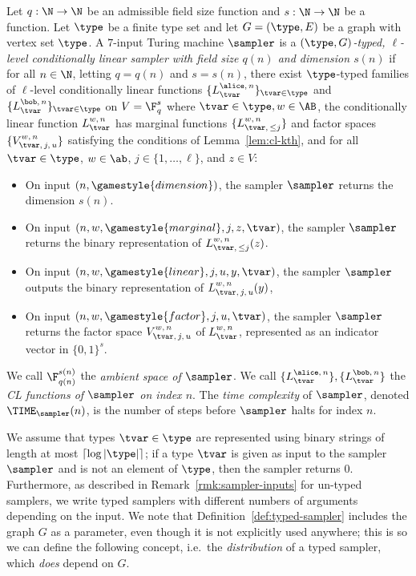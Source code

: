 \begin{definition}
  \label{def:typed-sampler}
	Let $q:\N \to \N$ be an admissible field size function and $s: \N \to \N$ be a
  function.
  Let $\type$ be a finite type set and let $G = (\type, E)$ be a graph with vertex set $\type$.
  A $7$-input Turing machine $\sampler$ is a \emph{$(\type, G)$-typed, $\ell$-level
    conditionally linear sampler with field size $q(n)$ and dimension $s(n)$} if
  for all $n \in \N$, letting $q = q(n)$ and $s = s(n)$, there exist
  $\type$-typed families of $\ell$-level conditionally linear functions
  $\{L^{\alice,\, n}_{\tvar}\}_{\tvar \in \type}$ and $\{L^{\bob,\,
    n}_{\tvar}\}_{\tvar \in \type}$ on $V = \F_q^s$ where $\tvar \in \type, w\in
  \AB$, the conditionally linear function $L^{w,\, n}_{\tvar}$ has marginal
  functions $\{L^{w,\, n}_{\tvar,\, \leq j}\}$ and factor spaces $\{V^{w,\,
    n}_{\tvar,\, j,\, u}\}$ satisfying the conditions of Lemma~\ref{lem:cl-kth},
  and for all $\tvar \in \type$, $w \in \ab$, $j \in \{1, \ldots, \ell\}$, and
  $z \in V$:
  \begin{itemize}
  \item On input $(n, \gamestyle{dimension})$, the sampler $\sampler$ returns
    the dimension $s(n)$.
	
	\item On input $(n, w, \gamestyle{marginal}, j, z, \tvar)$, the sampler
    $\sampler$ returns the binary representation of $L^{w,\, n}_{\tvar,\, \le
      j}(z)$.
			
			\item On input $(n, w, \gamestyle{linear}, j, u, y, \tvar)$, the sampler $\sampler$
    outputs the binary representation of $L^{w,\, n}_{\tvar,\, j,\, u}(y)$,

	\item On input $(n, w, \gamestyle{factor}, j, u, \tvar)$, the sampler
    $\sampler$ returns the factor space $V^{w,\, n}_{\tvar,\, j,\, u}$ of
    $L^{w,\, n}_{\tvar}$, represented as an indicator vector in $\{0,1\}^s$.
  \end{itemize}
  We call $\F_{q(n)}^{s(n)}$ the \emph{ambient space of $\sampler$}.
  We call $\{ L^{\alice,\, n}_{\tvar} \}, \{ L^{\bob,\, n}_{\tvar} \}$ the
  \emph{CL functions of $\sampler$ on index $n$}.
  The \emph{time complexity} of $\sampler$, denoted $\TIME_\sampler(n)$, is the
  number of steps before $\sampler$ halts for index $n$.
\end{definition}

We assume that types $\tvar \in \type$ are represented using binary strings of
length at most $\lceil \log |\type| \rceil$; if a type $\tvar$ is given as input
to the sampler $\sampler$ and is not an element of $\type$, then the sampler
returns $0$.
Furthermore, as described in Remark~\ref{rmk:sampler-inputs} for un-typed
samplers, we write typed samplers with different numbers of arguments depending
on the input.
We note that Definition~\ref{def:typed-sampler} includes the graph $G$ as a parameter, even though it is not explicitly used anywhere;
this is so we can define the following concept, i.e.\ the \emph{distribution} of a typed sampler, which \emph{does} depend on $G$.

